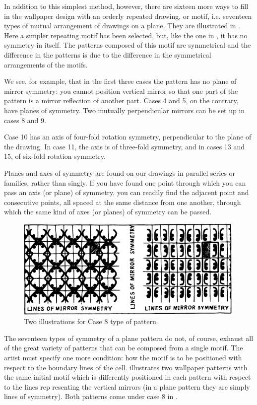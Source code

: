 In addition to this simplest method, however, there are sixteen more ways to fill in the wallpaper design with an orderly repeated drawing, or motif, i.e. seventeen types of mutual arrangement of drawings on a plane. They are illustrated in . Here a simpler repeating motif has been selected, but, like the one in , it has no symmetry in itself. The patterns composed of this motif are symmetrical and the difference in the patterns is due to the difference in the symmetrical arrangements of the motifs.

We see, for example, that in the first three cases the pattern has no plane of mirror symmetry: you cannot position vertical mirror so that one part of the pattern is a mirror reflection of another part. Cases 4 and 5, on the contrary, have planes of symmetry. Two mutually perpendicular mirrors can be set up in cases 8 and 9.

Case 10 has an axis of four-fold rotation symmetry, per­pendicular to the plane of the drawing. In case 11, the axis is of three-fold symmetry, and in cases 13 and 15, of six-fold rotation symmetry.

Planes and axes of symmetry are found on our drawings in parallel series or families, rather than singly. If you have found one point through which you can pass an axis (or plane) of symmetry, you can readily find the adjacent point and consecutive points, all spaced at the same distance from one another, through which the same kind of axes (or planes) of symmetry can be passed.


\begin{figure}[!ht]
\centering
\includegraphics[width=\textwidth]{figures/fig-02-12.pdf}
\caption{Two illustrations for Case 8 type of pattern.}
\label{fig-2.12}
\end{figure}

The seventeen types of symmetry of a plane pattern do not, of course, exhaust all of the great variety of patterns that can be composed from a single motif. The artist must specify one more condition: how the motif is to be positioned with respect to the boundary lines of the cell.  illustrates two wallpaper pat­terns with the same initial motif which is differently positioned in each pattern with respect to the lines rep­ resenting the vertical mirrors (in a plane pattern they are simply lines of symmetry). Both patterns come under case 8 in .

